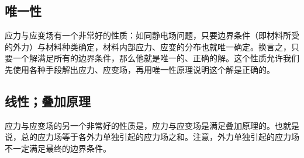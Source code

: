 
\begin{issues}
\issueDraft
\end{issues}

\subsection{唯一性}
应力与应变场有一个非常好的性质：如同静电场问题，只要边界条件（即材料所受的外力）与材料种类确定，材料内部应力、应变的分布也就唯一确定。换言之，只要一个解满足所有的边界条件，那么他就是唯一的、正确的解。这个性质允许我们先使用各种手段解出应力、应变场，再用唯一性原理说明这个解是正确的。

\subsection{线性；叠加原理}
应力与应变场的另一个非常好的性质是，应力与应变场是满足叠加原理的。也就是说，总的应力场等于各外力单独引起的应力场之和。注意，外力单独引起的应力场不一定满足最终的边界条件。

